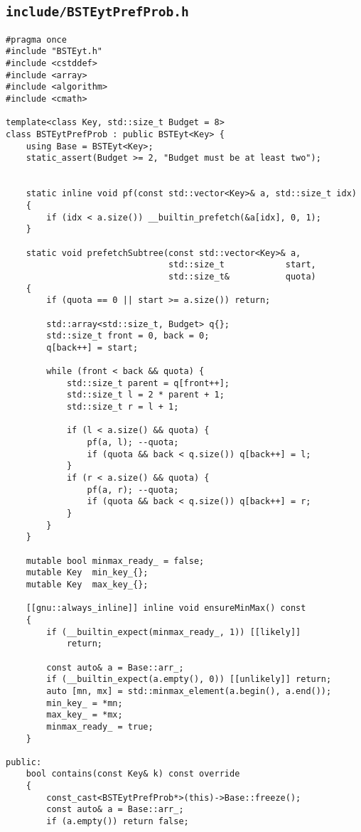\subsection{\texttt{include/BSTEytPrefProb.h}}
\label{secsec:bsteyt-pref-prob-h}
\begin{lstlisting}
#pragma once
#include "BSTEyt.h"
#include <cstddef>
#include <array>
#include <algorithm>
#include <cmath>

template<class Key, std::size_t Budget = 8>
class BSTEytPrefProb : public BSTEyt<Key> {
    using Base = BSTEyt<Key>;
    static_assert(Budget >= 2, "Budget must be at least two");


    static inline void pf(const std::vector<Key>& a, std::size_t idx)
    {
        if (idx < a.size()) __builtin_prefetch(&a[idx], 0, 1);
    }

    static void prefetchSubtree(const std::vector<Key>& a,
                                std::size_t            start,
                                std::size_t&           quota)
    {
        if (quota == 0 || start >= a.size()) return;

        std::array<std::size_t, Budget> q{};
        std::size_t front = 0, back = 0;
        q[back++] = start;

        while (front < back && quota) {
            std::size_t parent = q[front++];
            std::size_t l = 2 * parent + 1;
            std::size_t r = l + 1;

            if (l < a.size() && quota) {
                pf(a, l); --quota;
                if (quota && back < q.size()) q[back++] = l;
            }
            if (r < a.size() && quota) {
                pf(a, r); --quota;
                if (quota && back < q.size()) q[back++] = r;
            }
        }
    }

    mutable bool minmax_ready_ = false;
    mutable Key  min_key_{};
    mutable Key  max_key_{};

    [[gnu::always_inline]] inline void ensureMinMax() const
    {
        if (__builtin_expect(minmax_ready_, 1)) [[likely]]
            return;

        const auto& a = Base::arr_;
        if (__builtin_expect(a.empty(), 0)) [[unlikely]] return;                      
        auto [mn, mx] = std::minmax_element(a.begin(), a.end());
        min_key_ = *mn;
        max_key_ = *mx;
        minmax_ready_ = true;
    }

public:
    bool contains(const Key& k) const override
    {
        const_cast<BSTEytPrefProb*>(this)->Base::freeze();
        const auto& a = Base::arr_;
        if (a.empty()) return false;


\end{lstlisting}

